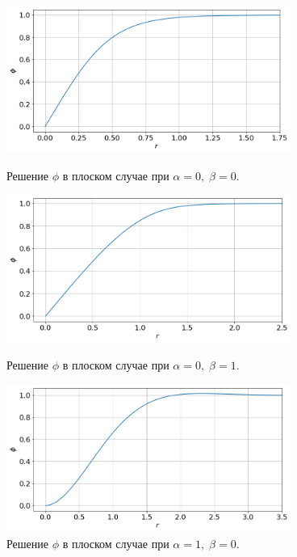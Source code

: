 \begin{figure}[!tp]
	\centering
	\includegraphics[width=0.83\textwidth]{figures/result_volumes.png}
	\vspace{-0.4cm}
	\caption{Решение $\phi$ в плоском случае при $\alpha = 0, \; \beta = 0$.}
	\label{fig:result_volumes}
	\vspace{0.5cm}

	\includegraphics[width=0.83\textwidth]{figures/result_volumes_p.png}
	\vspace{-0.4cm}
	\caption{Решение $\phi$ в плоском случае при $\alpha = 0, \; \beta = 1$.}
	\label{fig:result_volumes_p}
	\vspace{0.5cm}
	
	\includegraphics[width=0.83\textwidth]{figures/result_volumes_bi.png}
	\vspace{-0.4cm}
	\caption{Решение $\phi$ в плоском случае при $\alpha = 1, \; \beta = 0$.}
	\label{fig:result_volumes_bi}
\end{figure}

